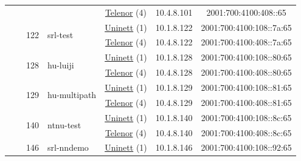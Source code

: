 \begin{small}
\begin{center}
\begin{longtable}{|c|c|c|c|c|c|c|c|}
  &  & \multicolumn{2}{|c|}{} & \multicolumn{2}{|c|}{\tiny{\href{https://www.telenor.no}{Telenor} (4)}} & \tiny{10.4.8.101} & \tiny{2001:700:4100:408::65} \\* \cline{3-3}\cline{4-4}\cline{5-5}\cline{6-6}\cline{7-7}\cline{8-8}
  &  & \multirow{2}{*}{\tiny{122}} & \multicolumn{1}{|l|}{\multirow{2}{*}{\tiny{srl-test}}} & \multicolumn{2}{|c|}{\tiny{\href{https://www.uninett.no}{Uninett} (1)}} & \tiny{10.1.8.122} & \tiny{2001:700:4100:108::7a:65} \\* \cline{5-5}\cline{6-6}\cline{7-7}\cline{8-8}
  &  &  &  & \multicolumn{2}{|c|}{\tiny{\href{https://www.telenor.no}{Telenor} (4)}} & \tiny{10.4.8.122} & \tiny{2001:700:4100:408::7a:65} \\* \cline{3-3}\cline{4-4}\cline{5-5}\cline{6-6}\cline{7-7}\cline{8-8}
  &  & \multirow{2}{*}{\tiny{128}} & \multicolumn{1}{|l|}{\multirow{2}{*}{\tiny{hu-luiji}}} & \multicolumn{2}{|c|}{\tiny{\href{https://www.uninett.no}{Uninett} (1)}} & \tiny{10.1.8.128} & \tiny{2001:700:4100:108::80:65} \\* \cline{5-5}\cline{6-6}\cline{7-7}\cline{8-8}
  &  &  &  & \multicolumn{2}{|c|}{\tiny{\href{https://www.telenor.no}{Telenor} (4)}} & \tiny{10.4.8.128} & \tiny{2001:700:4100:408::80:65} \\* \cline{3-3}\cline{4-4}\cline{5-5}\cline{6-6}\cline{7-7}\cline{8-8}
  &  & \multirow{2}{*}{\tiny{129}} & \multicolumn{1}{|l|}{\multirow{2}{*}{\tiny{hu-multipath}}} & \multicolumn{2}{|c|}{\tiny{\href{https://www.uninett.no}{Uninett} (1)}} & \tiny{10.1.8.129} & \tiny{2001:700:4100:108::81:65} \\* \cline{5-5}\cline{6-6}\cline{7-7}\cline{8-8}
  &  &  &  & \multicolumn{2}{|c|}{\tiny{\href{https://www.telenor.no}{Telenor} (4)}} & \tiny{10.4.8.129} & \tiny{2001:700:4100:408::81:65} \\* \cline{3-3}\cline{4-4}\cline{5-5}\cline{6-6}\cline{7-7}\cline{8-8}
  &  & \multirow{2}{*}{\tiny{140}} & \multicolumn{1}{|l|}{\multirow{2}{*}{\tiny{ntnu-test}}} & \multicolumn{2}{|c|}{\tiny{\href{https://www.uninett.no}{Uninett} (1)}} & \tiny{10.1.8.140} & \tiny{2001:700:4100:108::8c:65} \\* \cline{5-5}\cline{6-6}\cline{7-7}\cline{8-8}
  &  &  &  & \multicolumn{2}{|c|}{\tiny{\href{https://www.telenor.no}{Telenor} (4)}} & \tiny{10.4.8.140} & \tiny{2001:700:4100:408::8c:65} \\* \cline{3-3}\cline{4-4}\cline{5-5}\cline{6-6}\cline{7-7}\cline{8-8}
  &  & \multirow{2}{*}{\tiny{146}} & \multicolumn{1}{|l|}{\multirow{2}{*}{\tiny{srl-nndemo}}} & \multicolumn{2}{|c|}{\tiny{\href{https://www.uninett.no}{Uninett} (1)}} & \tiny{10.1.8.146} & \tiny{2001:700:4100:108::92:65} \\* \cline{5-5}\cline{6-6}\cline{7-7}\cline{8-8}

\end{longtable}
\end{center}
\end{small}
